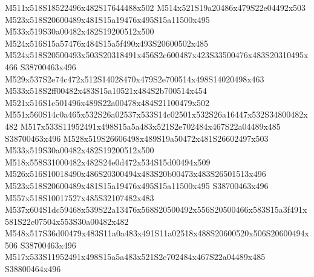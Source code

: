 \documentclass{article}
\begin{document}
\begin{multicols}{2}
M511x518S18522496x482S17644488x502 M514x521S19a20486x479S22e04492x503 M523x518S20600489x481S15a19476x495S15a11500x495 M533x519S30a00482x482S19200512x500 M524x516S15a57476x484S15a5f490x493S20600502x485 M524x518S20500493x503S20318491x456S2c600487x423S33500476x483S20310495x466 S38700463x496 M529x537S2e74c472x512S14028470x479S2e700514x498S14020498x463 M533x518S2ff00482x483S15a10521x484S2b700514x454 M521x516S1c501496x489S22a00478x484S21100479x502 M551x560S14c0a465x532S26a02537x533S14c02501x532S26a16447x532S34800482x482 M517x533S11952491x498S15a5a483x521S2e702484x467S22a04489x485 S38700463x496 M528x519S26606498x489S19a50472x481S26602497x503 M533x519S30a00482x482S19200512x500 M518x558S31000482x482S24e0d472x534S15d00494x509 M526x516S10018490x486S20300494x483S20b00473x483S26501513x496 M523x518S20600489x481S15a19476x495S15a11500x495 S38700463x496 M557x518S10017527x485S32107482x483 M537x604S1dc59468x539S22a13476x568S20500492x556S20500466x583S15a3f491x581S22c07504x553S30a00482x482 M548x517S36d00479x483S11a0a483x491S11a02518x488S20600520x506S20600494x506 S38700463x496 M517x533S11952491x498S15a5a483x521S2e702484x467S22a04489x485 S38800464x496









\end{multicols}
\end{document}
